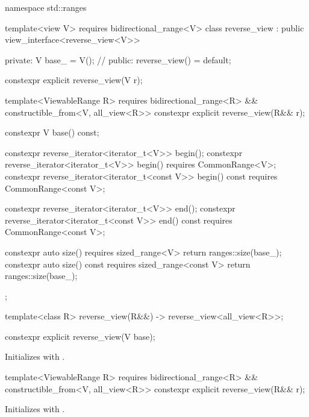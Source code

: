 %
\begin{codeblock}
namespace std::ranges {
  template<view V>
    requires bidirectional_range<V>
  class reverse_view : public view_interface<reverse_view<V>> {
  private:
    V base_ = V();  // \expos
  public:
    reverse_view() = default;

    constexpr explicit reverse_view(V r);

    template<ViewableRange R>
      requires bidirectional_range<R> && constructible_from<V, all_view<R>>
    constexpr explicit reverse_view(R&& r);

    constexpr V base() const;

    constexpr reverse_iterator<iterator_t<V>> begin();
    constexpr reverse_iterator<iterator_t<V>> begin() requires CommonRange<V>;
    constexpr reverse_iterator<iterator_t<const V>> begin() const
      requires CommonRange<const V>;

    constexpr reverse_iterator<iterator_t<V>> end();
    constexpr reverse_iterator<iterator_t<const V>> end() const
      requires CommonRange<const V>;

    constexpr auto size() requires sized_range<V> {
      return ranges::size(base_);
    }
    constexpr auto size() const requires sized_range<const V> {
      return ranges::size(base_);
    }
  };

  template<class R>
    reverse_view(R&&) -> reverse_view<all_view<R>>;
}
\end{codeblock}

%
\begin{itemdecl}
constexpr explicit reverse_view(V base);
\end{itemdecl}

\begin{itemdescr}
\pnum
\effects Initializes  with .
\end{itemdescr}

%
\begin{itemdecl}
template<ViewableRange R>
  requires bidirectional_range<R> && constructible_from<V, all_view<R>>
constexpr explicit reverse_view(R&& r);
\end{itemdecl}

\begin{itemdescr}
\pnum
\effects Initializes  with .
\end{itemdescr}

